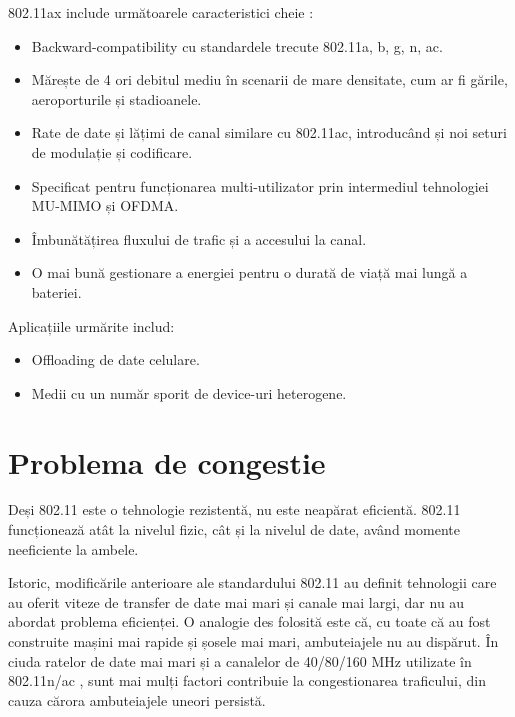 \documentclass[a4paper,12pt]{report}
\begin{document}
802.11ax include următoarele caracteristici cheie \cite{ieee802_11_ax_white_paper} \cite{info_802_11ax__features}:
\begin{itemize}
\item Backward-compatibility cu standardele trecute 802.11a, b, g, n, ac.
\item Mărește de 4 ori debitul mediu în scenarii de mare densitate, cum ar fi gările, aeroporturile și stadioanele.
\item Rate de date și lățimi de canal similare cu 802.11ac, introducând și noi seturi de modulație și codificare.
\item Specificat pentru funcționarea multi-utilizator prin intermediul tehnologiei \ac{MU-MIMO} și \ac{OFDMA}.
\item Îmbunătățirea fluxului de trafic și a accesului la canal.
\item O mai bună gestionare a energiei pentru o durată de viață mai lungă a bateriei.
\end{itemize}

Aplicațiile urmărite includ:
\begin{itemize}
\item Offloading de date celulare.
\item Medii cu un număr sporit de device-uri heterogene.
\end{itemize}


\section{Problema de congestie}

Deși 802.11 este o tehnologie rezistentă, nu este neapărat eficientă.
802.11 funcționează atât la nivelul fizic, cât și la nivelul de date, având momente neeficiente la ambele.

Istoric, modificările anterioare ale standardului 802.11 au definit tehnologii care au oferit viteze de transfer de date mai mari și canale mai largi, dar nu au abordat problema eficienței.
O analogie des folosită este că, cu toate că au fost construite mașini mai rapide și șosele mai mari, ambuteiajele nu au dispărut.
În ciuda ratelor de date mai mari și a canalelor de 40/80/160 MHz utilizate în 802.11n/ac \cite{ieee802_11_ac_white_paper}, sunt mai mulți factori contribuie la congestionarea traficului, din cauza cărora ambuteiajele uneori persistă.
\end{document}
